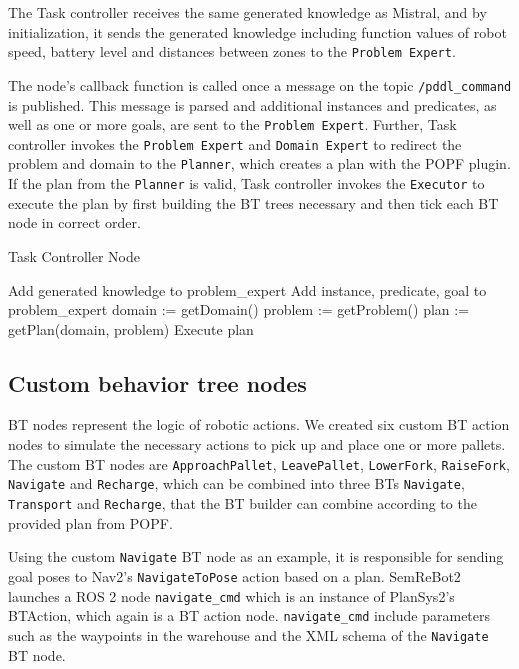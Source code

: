 The Task controller receives the same generated knowledge as Mistral, and by initialization, it sends the generated knowledge including function values of robot speed, battery level and distances between zones to the \verb|Problem Expert|.

The node's callback function is called once a message on the topic \verb|/pddl_command| is published. This message is parsed and additional instances and predicates, as well as one or more goals, are sent to the \verb|Problem Expert|. Further, Task controller invokes the \verb|Problem Expert| and \verb|Domain Expert| to redirect the problem and domain to the \verb|Planner|, which creates a plan with the POPF plugin. If the plan from the \verb|Planner| is valid, Task controller invokes the \verb|Executor| to execute the plan by first building the BT trees necessary and then tick each BT node in correct order.

\begin{algorithm}\label{alg:task_controller}
\caption{Task Controller Node}
    \begin{algorithmic}[1]
        \State Add generated knowledge to problem\_expert
                \State Add instance, predicate, goal to problem\_expert
            \EndFor
            \State domain := getDomain()
            \State problem := getProblem()
            \State plan := getPlan(domain, problem)
                \State Execute plan
            \EndIf
        \EndProcedure
    \end{algorithmic}
\end{algorithm}

\subsection{Custom behavior tree nodes}\label{ssec:custom_behavior_tree_nodes}
BT nodes represent the logic of robotic actions. We created six custom BT action nodes to simulate the necessary actions to pick up and place one or more pallets. The custom BT nodes are \verb|ApproachPallet|, \verb|LeavePallet|, \verb|LowerFork|, \verb|RaiseFork|, \verb|Navigate| and \verb|Recharge|, which can be combined into three BTs \verb|Navigate|, \verb|Transport| and \verb|Recharge|, that the BT builder can combine according to the provided plan from POPF.

Using the custom \verb|Navigate| BT node as an example, it is responsible for sending goal poses to Nav2's \verb|NavigateToPose| action based on a plan. SemReBot2 launches a ROS 2 node \newline\verb|navigate_cmd| which is an instance of PlanSys2's BTAction, which again is a BT action node. \verb|navigate_cmd| include parameters such as the waypoints in the warehouse and the XML schema of the \verb|Navigate| BT node.

